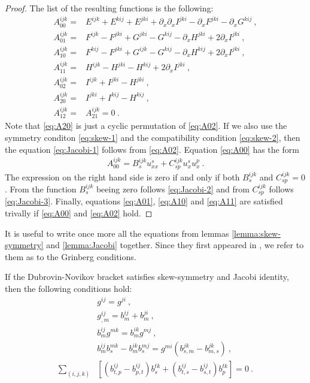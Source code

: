 \begin{proof}
    The list of the resulting functions is the following:
    \begin{align}
        A_{00}^{ijk} =& E^{ijk} + E^{kij} + E^{jki} + \partial_x \partial_x I^{jki} - \partial_x F^{jki} - \partial_x G^{kij} \:, \label{eq:A00}\\
        A_{01}^{ijk} =& F^{ijk} - F^{jki} + G^{jki} - G^{kij} - \partial_x H^{jki} + 2 \partial_x I^{jki} \:, \label{eq:A01}\\
        A_{10}^{ijk} =& F^{kij} - F^{jki} + G^{ijk} - G^{kij} - \partial_x H^{kij} + 2 \partial_x I^{jki} \:, \label{eq:A10}\\
        A_{11}^{ijk} =& H^{ijk} - H^{jki} - H^{kij} + 2 \partial_x I^{jki} \:, \label{eq:A11} \\
        A_{02}^{ijk} =& I^{ijk} + I^{jki} - H^{jki}\:, \label{eq:A02}\\
        A_{20}^{ijk} =& I^{jki} + I^{kij} - H^{kij}\:, \label{eq:A20} \\
        A^{ijk}_{12} =& A^{ijk}_{21} = 0 \:.
    \end{align}
    Note that \eqref{eq:A20} is just a cyclic permutation of \eqref{eq:A02}. If we also use the symmetry conditon \eqref{eq:skew-1} and the compatibility condition \eqref{eq:skew-2}, then the equation \eqref{eq:Jacobi-1} follows from \eqref{eq:A02}. Equation \eqref{eq:A00} has the form
    \begin{align}
        A_00^{ijk} = B^{ijk}_s u^s_{xx} + C^{ijk}_{sp} u^s_x u^p_x \:.
    \end{align}
    The expression on the right hand side is zero if and only if both $B^{ijk}_s$ and $C^{ijk}_{sp} = 0$. From the function $B^{ijk}_s$ beeing zero follows \eqref{eq:Jacobi-2} and from $C^{ijk}_{sp}$ follows \eqref{eq:Jacobi-3}. Finally, equations \eqref{eq:A01}, \eqref{eq:A10} and \eqref{eq:A11} are satisfied trivally if \eqref{eq:A00} and \eqref{eq:A02} hold.
\end{proof}

It is useful to write once more all the equations from lemmas \vref{lemma:skew-symmetry} and \vref{lemma:Jacobi} together. Since they first appeared in \cite{Grinberg}, we refer to them as to the Grinberg conditions.
\begin{lemma} \label{Grinberg conditions}
    If the Dubrovin-Novikov bracket satisfies skew-symmetry and Jacobi identity, then the following conditions hold:
    \begin{align}
        &g^{ij} = g^{ji} \:, \label{eq:Grinberg-1}\\
        &g^{ij}_{,m} = b^{ij}_m + b^{ji}_m \:, \label{eq:Grinberg-2}\\
        &b^{ij}_m g^{mk} = b^{ik}_m g^{mj} \:, \label{eq:Grinberg-3}\\
        &b^{ij}_{m} b^{mk}_s - b^{ik}_m b^{mj}_s = g^{mi} \left( b^{jk}_{s,m} - b^{jk}_{m,s} \right) \:, \label{eq:Grinberg-4}\\
        \sum_{(i,j,k)}& \left[ (b^{ij}_{t,p} - b^{ij}_{p,t}) b^{tk}_s + (b^{ij}_{t,s} - b^{ij}_{s,t}) b^{tk}_p \right] = 0 \:. \label{eq:Grinberg-5}
    \end{align}
\end{lemma}

